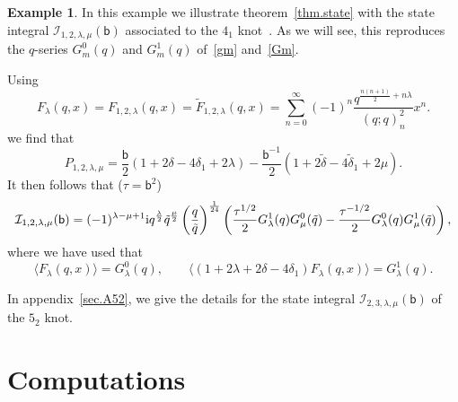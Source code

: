\documentclass[12pt,reqno]{amsart}
\theoremstyle{definition}
\newtheorem{problem}[theorem]{Problem}
\newtheorem{example}[theorem]{Example}
\def\BQ{\mathbbm Q}
\def\calI{\mathcal I}
\def\calI{\mathcal I}
\def\tq{\tilde{q}}
\def\be{\begin{equation}}
\def\Phih{\widehat\Phi}
\def\bb{\mathsf{b}}
\def\ri{\mathrm{i}}
\def\wt{\widetilde}
\def\vev#1{\langle #1 \rangle}
\def\ri{{\rm i}}
\begin{document}
  \begin{example}
\label{ex.41s}
In this example we illustrate theorem~\ref{thm.state} with the
state integral $\calI_{1,2,\lambda,\mu}(\bb)$ associated to the $4_1$
knot~\cite{AK}. As we will see, this reproduces the $q$-series
$G^0_m(q)$ and $G^1_m(q)$ of~\eqref{gm} and~\eqref{Gm}.

Using
  \begin{equation}
    F_\lambda(q,x) = F_{1,2,\lambda}(q,x) = \wt{F}_{1,2,\lambda}(q,x)
    = \sum_{n=0}^\infty (-1)^n \frac{q^{\frac{n(n+1)}{2}+n\lambda}}{(q;q)_n^2}x^n.
  \end{equation}
  we find that 
  \begin{equation}
    P_{1,2,\lambda,\mu} =
    \frac{\bb}{2}(1+2\delta - 4\delta_1+2\lambda)
    -\frac{\bb^{-1}}{2}(1+2\tilde{\delta} - 4\tilde{\delta}_1 + 2\mu).
  \end{equation}
  It then follows that ($\tau = \bb^2$)
  \begin{equation}
  \label{desc-41}
    \calI_{1,2,\lambda,\mu}(\bb)
    =
    (-1)^{\lambda-\mu+1}\ri q^{\frac{\lambda}{2}}\tq^{\frac{\mu}{2}}
    \left(\frac{q}{\tq}\right)^{\frac{1}{24}}
    \left(\frac{\tau^{1/2}}{2}G^1_\lambda(q)G^0_\mu(\tq) -
      \frac{\tau^{-1/2}}{2}G^0_\lambda(q)G^1_\mu(\tq)\right),
  \end{equation}
  where we have used that
  \be
  \vev{F_{\lambda}(q,x)}=G^0_\lambda(q) , \qquad
  \vev{(1+2\lambda+2\delta-4\delta_1)F_\lambda(q,x)}=G^1_\lambda(q). 
    \end{equation}
\end{example}
In appendix~\ref{sec.A52}, we give the details for the state integral
$\calI_{2,3,\lambda,\mu}(\bb)$ of the $5_2$ knot.




\section{Computations}
\label{sec.compute}
\end{document}
